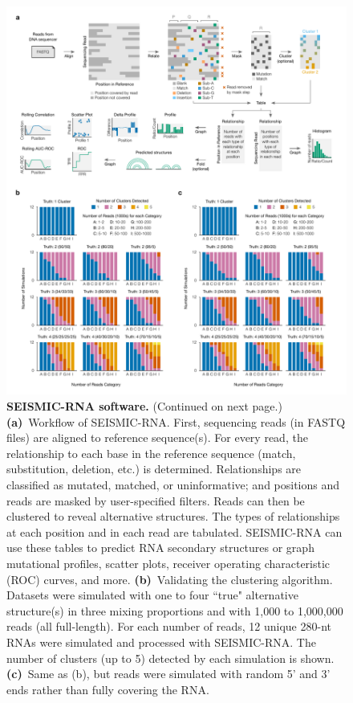 \documentclass[main.tex]{subfiles}
\begin{document}
\begin{figure}[H]
	\includegraphics[width=\textwidth]{../MainFigures/seismic-wf/seismic-wf.pdf}
	\caption{\textbf{SEISMIC-RNA software.} (Continued on next page.) \textbf{(a)}~Workflow of SEISMIC-RNA. First, sequencing reads (in FASTQ files) are aligned to reference sequence(s). For every read, the relationship to each base in the reference sequence (match, substitution, deletion, etc.) is determined. Relationships are classified as mutated, matched, or uninformative; and positions and reads are masked by user-specified filters. Reads can then be clustered to reveal alternative structures. The types of relationships at each position and in each read are tabulated. SEISMIC-RNA can use these tables to predict RNA secondary structures or graph mutational profiles, scatter plots, receiver operating characteristic (ROC) curves, and more. \textbf{(b)}~Validating the clustering algorithm. Datasets were simulated with one to four ``true" alternative structure(s) in three mixing proportions and with 1,000 to 1,000,000 reads (all full-length). For each number of reads, 12 unique 280-nt RNAs were simulated and processed with SEISMIC-RNA. The number of clusters (up to 5) detected by each simulation is shown. \textbf{(c)}~Same as (b), but reads were simulated with random 5' and 3' ends rather than fully covering the RNA.}
	\label{seismic-wf}
\end{figure}
\end{document}
